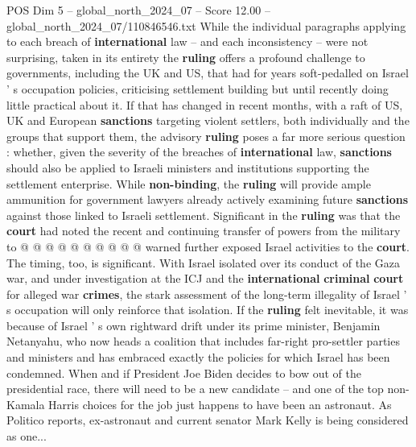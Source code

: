\begin{textsample}{POS Dim 5 – global\_north\_2024\_07 – Score 12.00 – global\_north\_2024\_07/110846546.txt}
While the individual paragraphs applying to each breach of \textbf{international} law -- and each inconsistency -- were not surprising, taken in its entirety the \textbf{ruling} offers a profound challenge to governments, including the UK and US, that had for years soft-pedalled on Israel ' s occupation policies, criticising settlement building but until recently doing little practical about it.
If that has changed in recent months, with a raft of US, UK and European \textbf{sanctions} targeting violent settlers, both individually and the groups that support them, the advisory \textbf{ruling} poses a far more serious question : whether, given the severity of the breaches of \textbf{international} law, \textbf{sanctions} should also be applied to Israeli ministers and institutions supporting the settlement enterprise.
While \textbf{non-binding}, the \textbf{ruling} will provide ample ammunition for government lawyers already actively examining future \textbf{sanctions} against those linked to Israeli settlement.
Significant in the \textbf{ruling} was that the \textbf{court} had noted the recent and continuing transfer of powers from the military to @ @ @ @ @ @ @ @ @ @ warned further exposed Israel activities to the \textbf{court}.
The timing, too, is significant.
With Israel isolated over its conduct of the Gaza war, and under investigation at the ICJ and the \textbf{international} \textbf{criminal} \textbf{court} for alleged war \textbf{crimes}, the stark assessment of the long-term illegality of Israel ' s occupation will only reinforce that isolation.
If the \textbf{ruling} felt inevitable, it was because of Israel ' s own rightward drift under its prime minister, Benjamin Netanyahu, who now heads a coalition that includes far-right pro-settler parties and ministers and has embraced exactly the policies for which Israel has been condemned.
When and if President Joe Biden decides to bow out of the presidential race, there will need to be a new candidate -- and one of the top non-Kamala Harris choices for the job just happens to have been an astronaut.
As Politico reports, ex-astronaut and current senator Mark Kelly is being considered as one...

\end{textsample}
